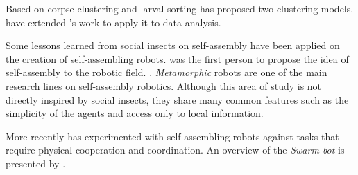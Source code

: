 Based on corpse clustering and larval sorting \citeauthor{citeulike:1646663} \cite{citeulike:1646663} has proposed two clustering models.  \citeauthor{lumer_faieta_1994} \cite{lumer_faieta_1994} have extended \citeauthor{citeulike:1646663}'s work to apply it to data analysis.

Some lessons learned from social insects on self-assembly have been applied on the creation of self-assembling robots. \citeauthor{100066} \cite{100066} was the first person to propose the idea of self-assembly to the robotic field. \cite{bonabeau1999swarm}. \emph{Metamorphic} robots \cite{Chirikjian94} are one of the main research lines on self-assembly robotics. Although this area of study is not directly inspired by social insects, they share many common features such as the simplicity of the agents and access only to local information.

More recently \citeauthor{Dorigo05swarm-bot:an} \cite{Dorigo05swarm-bot:an} has experimented with self-assembling robots against tasks that require physical cooperation and coordination. An overview of the \emph{Swarm-bot} \cite{Dorigo05swarm-bot:an} is presented by \citeauthor{6094854} \cite{6094854}.





